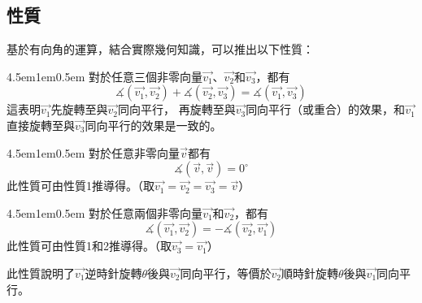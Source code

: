 \documentclass[12pt]{article}
\begin{document}
\subsection{性質}
基於有向角的運算，結合實際幾何知識，可以推出以下性質：
\begin{mybox}[性質1]{4.5em}{1em}{0.5em}
    對於任意三個非零向量$\overrightarrow{v_1}$、$\overrightarrow{v_2}$和$\overrightarrow{v_3}$，都有
    $$
        \measuredangle{\left(\overrightarrow{v_1},\overrightarrow{v_2}\right)}+\measuredangle{\left(\overrightarrow{v_2},\overrightarrow{v_3}\right)}
        =\measuredangle{\left(\overrightarrow{v_1},\overrightarrow{v_3}\right)}
    $$
    這表明$\overrightarrow{v_1}$先旋轉至與$\overrightarrow{v_2}$同向平行，
    再旋轉至與$\overrightarrow{v_3}$同向平行（或重合）的效果，和$\overrightarrow{v_1}$直接旋轉至與$\overrightarrow{v_3}$同向平行的效果是一致的。
\end{mybox}
\begin{mybox}[性質2]{4.5em}{1em}{0.5em}
    對於任意非零向量$\overrightarrow{v}$都有
    $$
        \measuredangle{\left(\overrightarrow{v},\overrightarrow{v}\right)}=0^{\circ}
    $$
    此性質可由性質1推導得。（取$\overrightarrow{v_1}=\overrightarrow{v_2}=\overrightarrow{v_3}=\overrightarrow{v}$）
\end{mybox}
\begin{mybox}[性質3]{4.5em}{1em}{0.5em}
    對於任意兩個非零向量$\overrightarrow{v_1}$和$\overrightarrow{v_2}$，都有
    $$
        \measuredangle{\left(\overrightarrow{v_1},\overrightarrow{v_2}\right)}=-\measuredangle{\left(\overrightarrow{v_2},\overrightarrow{v_1}\right)}
    $$
    此性質可由性質1和2推導得。（取$\overrightarrow{v_3}=\overrightarrow{v_1}$）

    此性質說明了$\overrightarrow{v_1}$逆時針旋轉$\theta$後與$\overrightarrow{v_2}$同向平行，等價於$\overrightarrow{v_2}$順時針旋轉$\theta$後與$\overrightarrow{v_1}$同向平行。
\end{mybox}
\end{document}
